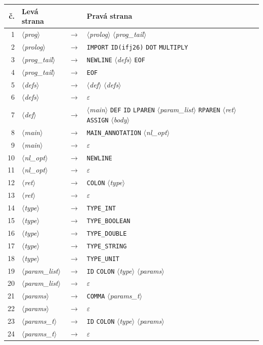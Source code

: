 \documentclass[a4paper,11pt]{article}
\newcommand{\nt}[1]{$\langle$\textit{#1}$\rangle$}   %
\newcommand{\tk}[1]{\texttt{#1}}                     %
\begin{document}
\begin{longtable}{r l c l}
\toprule
\textbf{č.} & \textbf{Levá strana} & & \textbf{Pravá strana} \\
\midrule
\endhead
1 & \nt{prog} & $\rightarrow$ & \nt{prolog} \nt{prog\_tail} \\
2 & \nt{prolog} & $\rightarrow$ & \tk{IMPORT} \tk{ID(ifj26)} \tk{DOT} \tk{MULTIPLY} \\
3 & \nt{prog\_tail} & $\rightarrow$ & \tk{NEWLINE} \nt{defs} \tk{EOF} \\
4 & \nt{prog\_tail} & $\rightarrow$ & \tk{EOF} \\
5 & \nt{defs} & $\rightarrow$ & \nt{def} \nt{defs} \\
6 & \nt{defs} & $\rightarrow$ & $\varepsilon$ \\
7 & \nt{def} & $\rightarrow$ & \nt{main} \tk{DEF} \tk{ID} \tk{LPAREN} \nt{param\_list} \tk{RPAREN} \nt{ret} \tk{ASSIGN} \nt{body} \\
8 & \nt{main} & $\rightarrow$ & \tk{MAIN\_ANNOTATION} \nt{nl\_opt} \\
9 & \nt{main} & $\rightarrow$ & $\varepsilon$ \\
10 & \nt{nl\_opt} & $\rightarrow$ & \tk{NEWLINE} \\
11 & \nt{nl\_opt} & $\rightarrow$ & $\varepsilon$ \\
12 & \nt{ret} & $\rightarrow$ & \tk{COLON} \nt{type} \\
13 & \nt{ret} & $\rightarrow$ & $\varepsilon$ \\
14 & \nt{type} & $\rightarrow$ & \tk{TYPE\_INT} \\
15 & \nt{type} & $\rightarrow$ & \tk{TYPE\_BOOLEAN} \\
16 & \nt{type} & $\rightarrow$ & \tk{TYPE\_DOUBLE} \\
17 & \nt{type} & $\rightarrow$ & \tk{TYPE\_STRING} \\
18 & \nt{type} & $\rightarrow$ & \tk{TYPE\_UNIT} \\
19 & \nt{param\_list} & $\rightarrow$ & \tk{ID} \tk{COLON} \nt{type} \nt{params} \\
20 & \nt{param\_list} & $\rightarrow$ & $\varepsilon$ \\
21 & \nt{params} & $\rightarrow$ & \tk{COMMA} \nt{params\_t} \\
22 & \nt{params} & $\rightarrow$ & $\varepsilon$ \\
23 & \nt{params\_t} & $\rightarrow$ & \tk{ID} \tk{COLON} \nt{type} \nt{params} \\
24 & \nt{params\_t} & $\rightarrow$ & $\varepsilon$ \\

\end{longtable}
\end{document}

